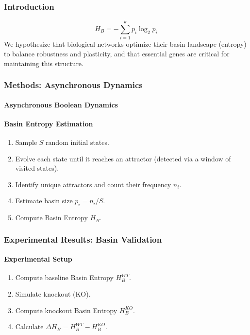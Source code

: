 





\subsubsection{Introduction}
\[ H_B = - \sum_{i=1}^{k} p_i \log_2 p_i \]
We hypothesize that biological networks optimize their basin landscape (entropy) to balance robustness and plasticity, and that essential genes are critical for maintaining this structure.

\subsubsection{Methods: Asynchronous Dynamics}

\paragraph{Asynchronous Boolean Dynamics}

\paragraph{Basin Entropy Estimation}
\begin{enumerate}
    \item Sample $S$ random initial states.
    \item Evolve each state until it reaches an attractor (detected via a window of visited states).
    \item Identify unique attractors and count their frequency $n_i$.
    \item Estimate basin size $p_i = n_i / S$.
    \item Compute Basin Entropy $H_B$.
\end{enumerate}

\subsubsection{Experimental Results: Basin Validation}

\paragraph{Experimental Setup}
\begin{enumerate}
    \item Compute baseline Basin Entropy $H_B^{WT}$.
    \item Simulate knockout (KO).
    \item Compute knockout Basin Entropy $H_B^{KO}$.
    \item Calculate $\Delta H_B = H_B^{WT} - H_B^{KO}$.
\end{enumerate}

